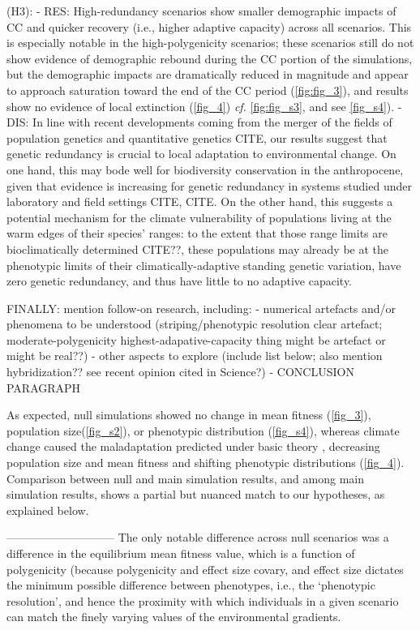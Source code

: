 \documentclass[9pt,twocolumn,twoside,lineno]{pnas-new}
\begin{document}
    (H3):
      - RES: High-redundancy scenarios show smaller demographic impacts of CC and quicker recovery (i.e., higher adaptive capacity) across all scenarios. This is especially notable in the high-polygenicity scenarios; these scenarios still do not show evidence of demographic rebound during the CC portion of the simulations, but the demographic impacts are dramatically reduced in magnitude and appear to approach saturation toward the end of the CC period (\ref{fig:fig_3}), and results show no evidence of local extinction (\ref{fig_4}) \textit{cf.} \ref{fig:fig_s3}, and see \ref{fig_s4}).
      - DIS: In line with recent developments coming from the merger of the fields of population genetics and quantitative genetics CITE, our results suggest that genetic redundancy is crucial to local adaptation to environmental change. On one hand, this may bode well for biodiversity conservation in the anthropocene, given that evidence is increasing for genetic redundancy in systems studied under laboratory and field settings CITE, CITE. On the other hand, this suggests a potential mechanism for the climate vulnerability of populations living at the warm edges of their species' ranges: to the extent that those range limits are bioclimatically determined CITE??, these populations may already be at the phenotypic limits of their climatically-adaptive standing genetic variation, have zero genetic redundancy, and thus have little to no adaptive capacity.
      
      FINALLY: mention follow-on research, including:
        - numerical artefacts and/or phenomena to be understood (striping/phenotypic resolution clear artefact; moderate-polygenicity highest-adapative-capacity thing might be artefact or might be real??)
        - other aspects to explore (include list below; also mention hybridization?? see recent opinion cited in Science?)
        - CONCLUSION PARAGRAPH

As expected, null simulations showed no change in mean fitness (\ref{fig_3}),
population size(\ref{fig_s2}), or phenotypic distribution (\ref{fig_s4}),
whereas climate change caused the maladaptation predicted under basic theory
\cite{aitken_whitlock},
decreasing population size and mean fitness and shifting phenotypic distributions (\ref{fig_4}).
Comparison between null and main simulation results, and among main simulation results,
shows a partial but nuanced match to our hypotheses, as explained below.



-----------------------------
The only notable difference across null scenarios was a difference in the 
equilibrium mean fitness value, which is a function of polygenicity
(because polygenicity and effect size covary,
and effect size dictates the minimum possible difference between phenotypes,
i.e., the `phenotypic resolution', and hence the proximity with which individuals in a given scenario can 
match the finely varying values of the environmental gradients.
\end{document}
